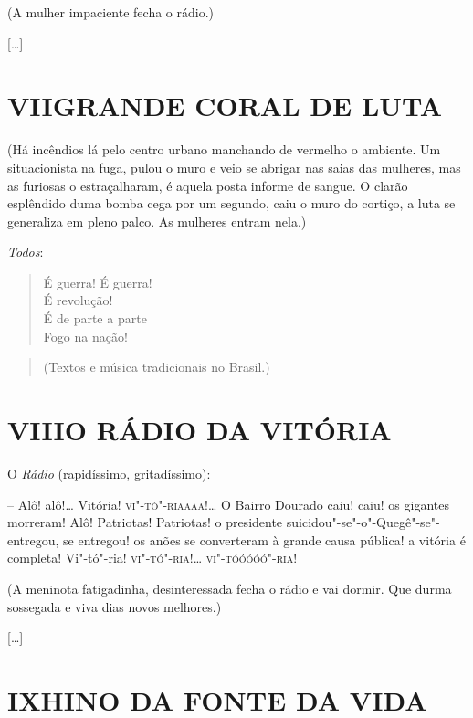 \hfill{}(A mulher impaciente fecha o rádio.)

{[}\ldots{}{]}

\pagebreak
\section*{VII\break GRANDE CORAL DE LUTA}

\hfill\parbox{150pt}{
(Há incêndios lá pelo centro urbano manchando de vermelho o ambiente. Um
situacionista na fuga, pulou o muro e veio se abrigar nas saias das
mulheres, mas as furiosas o estraçalharam, é aquela posta informe de
sangue. O clarão esplêndido duma bomba cega por um segundo, caiu o muro
do cortiço, a luta se generaliza em pleno palco. As mulheres entram
nela.)
}

\emph{Todos}:

\begin{verse}
É guerra! É guerra!\\
É revolução!\\
É de parte a parte\\
Fogo na nação!
\end{verse}


\begin{quote}
(Textos e música tradicionais no Brasil.)
\end{quote}

\section*{VIII\break O RÁDIO DA VITÓRIA}

O \emph{Rádio} (rapidíssimo, gritadíssimo):

-- Alô! alô!\ldots{} Vitória! \textsc{vi"-tó"-riaaaa}!\ldots{} O Bairro Dourado caiu! caiu!
os gigantes morreram! Alô! Patriotas! Patriotas! o presidente
suicidou"-se"-o"-Quegê"-se"-entregou, se entregou! os anões se converteram à
grande causa pública! a vitória é completa! Vi"-tó"-ria! \textsc{vi"-tó"-ria}!\ldots{}
\textsc{vi"-tóóóóó"-ria!}

\hfill\parbox{150pt}{
(A meninota fatigadinha, desinteressada fecha o rádio e vai dormir. Que
durma sossegada e viva dias novos melhores.)
}

{[}\ldots{}{]}

\section*{IX\break HINO DA FONTE DA VIDA}

